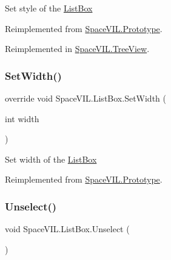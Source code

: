 Set style of the \mbox{\hyperlink{class_space_v_i_l_1_1_list_box}{List\+Box}} 



Reimplemented from \mbox{\hyperlink{class_space_v_i_l_1_1_prototype_ae96644a6ace490afb376fb542161e541}{Space\+V\+I\+L.\+Prototype}}.



Reimplemented in \mbox{\hyperlink{class_space_v_i_l_1_1_tree_view_aac5935163cddb3e34bcef8ee112ae1dd}{Space\+V\+I\+L.\+Tree\+View}}.

\mbox{\label{class_space_v_i_l_1_1_list_box_a6e41c4678cdfd8b1a68ed0280b50cfff}} 
\subsubsection{\texorpdfstring{Set\+Width()}{SetWidth()}}
{\footnotesize\ttfamily override void Space\+V\+I\+L.\+List\+Box.\+Set\+Width (\begin{DoxyParamCaption}\item[{int}]{width }\end{DoxyParamCaption})\hspace{0.3cm}{\ttfamily [virtual]}}



Set width of the \mbox{\hyperlink{class_space_v_i_l_1_1_list_box}{List\+Box}} 



Reimplemented from \mbox{\hyperlink{class_space_v_i_l_1_1_prototype_a6a4f1b9581f4d18f1c3a3e287d4b2a2b}{Space\+V\+I\+L.\+Prototype}}.

\mbox{\label{class_space_v_i_l_1_1_list_box_abc68331993bf0f0c54775f309edfc83b}} 
\subsubsection{\texorpdfstring{Unselect()}{Unselect()}}
{\footnotesize\ttfamily void Space\+V\+I\+L.\+List\+Box.\+Unselect (\begin{DoxyParamCaption}{ }\end{DoxyParamCaption})}



